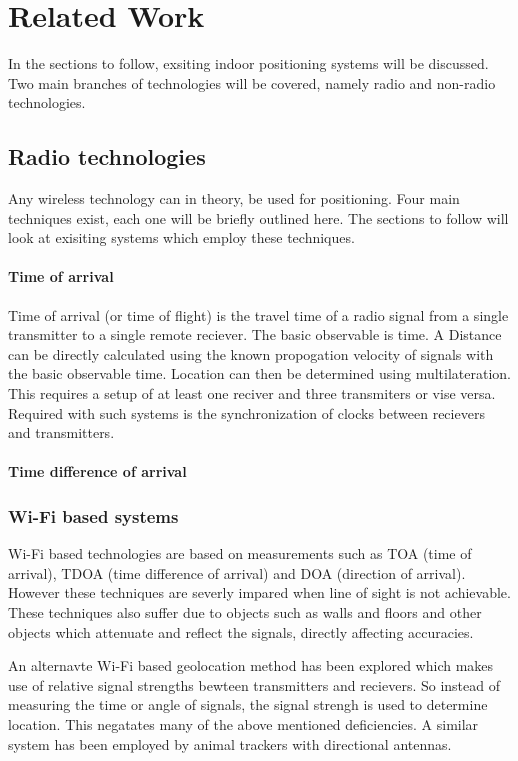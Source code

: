 \section{Related Work}
In the sections to follow, exsiting indoor positioning systems will be discussed. Two main branches of technologies will be covered, namely radio and non-radio technologies.

\subsection{Radio technologies}
Any wireless technology can in theory, be used for positioning. Four main techniques exist, each one will be briefly outlined here. The sections to follow will look at exisiting systems which employ these techniques.

\paragraph{Time of arrival}
Time of arrival (or time of flight) is the travel time of a radio signal from a single transmitter to a single remote reciever. The basic observable is time. A Distance can be directly calculated using the known propogation velocity of signals with the basic observable time. Location can then be determined using multilateration. This requires a setup of at least one reciver and three transmiters or vise versa.
Required with such systems is the synchronization of clocks between recievers and transmitters.
\cite{k._pahlavan_wideband_1998}

\paragraph{Time difference of arrival}


\subsubsection{Wi-Fi based systems}
Wi-Fi based technologies are based on measurements such as TOA (time of arrival), TDOA (time difference of arrival) and DOA (direction of arrival). However these techniques are severly impared when line of sight is not achievable. These techniques also suffer due to objects such as walls and floors and other objects which attenuate and reflect the signals, directly affecting accuracies.

An alternavte Wi-Fi based geolocation method has been explored which makes use of relative signal strengths bewteen transmitters and recievers. So instead of measuring the time or angle of signals, the signal strengh is used to determine location. This negatates many of the above mentioned deficiencies. A similar system has been employed by animal trackers with directional antennas.
\cite{yongguang_chen_signal_2002}

